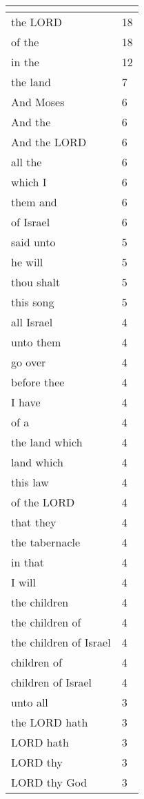 \begin{center}
\begin{longtable}{|p{3.0in}|p{0.5in}|}
\hline \multicolumn{2}{c}{{ }} \\ \hline
\endfoot 
the LORD & 18\\ \hline 
of the & 18\\ \hline 
in the & 12\\ \hline 
the land & 7\\ \hline 
And Moses & 6\\ \hline 
And the & 6\\ \hline 
And the LORD & 6\\ \hline 
all the & 6\\ \hline 
which I & 6\\ \hline 
them and & 6\\ \hline 
of Israel & 6\\ \hline 
said unto & 5\\ \hline 
he will & 5\\ \hline 
thou shalt & 5\\ \hline 
this song & 5\\ \hline 
all Israel & 4\\ \hline 
unto them & 4\\ \hline 
go over & 4\\ \hline 
before thee & 4\\ \hline 
I have & 4\\ \hline 
of a & 4\\ \hline 
the land which & 4\\ \hline 
land which & 4\\ \hline 
this law & 4\\ \hline 
of the LORD & 4\\ \hline 
that they & 4\\ \hline 
the tabernacle & 4\\ \hline 
in that & 4\\ \hline 
I will & 4\\ \hline 
the children & 4\\ \hline 
the children of & 4\\ \hline 
the children of Israel & 4\\ \hline 
children of & 4\\ \hline 
children of Israel & 4\\ \hline 
unto all & 3\\ \hline 
the LORD hath & 3\\ \hline 
LORD hath & 3\\ \hline 
LORD thy & 3\\ \hline 
LORD thy God & 3\\ \hline 

\end{longtable}
\end{center}
